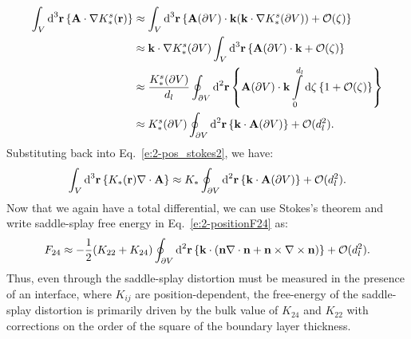 \begin{align}
  \int_{V} \textup{d}^3\mathbf{r} \left \{ \mathbf{A} \cdot \nabla K_{*}^s (\mathbf{r}) \right \} & \approx
  \int_{V} \textup{d}^3\mathbf{r} \left \{\mathbf{A}(\partial V) \cdot \mathbf{k}(\mathbf{k} \cdot \nabla K_*^s(\partial V))  + \mathcal{O}(\zeta) \right \} \\ & \approx
  \mathbf{k} \cdot \nabla K_*^s(\partial V) \int_{V} \textup{d}^3\mathbf{r}\left \{\mathbf{A}(\partial V) \cdot \mathbf{k} + \mathcal{O}(\zeta) \right \} \\ & \approx
  \frac{K_*^s(\partial V)}{d_l} \oint_{\partial V} \textup{d}^2\mathbf{r}\left \{\mathbf{A}(\partial V) \cdot \mathbf{k} \int\limits_{0}^{d_l} \textup{d}\zeta \left \{ 1 + \mathcal{O}(\zeta) \right \}\right \} \\ & \approx
  K_*^s(\partial V) \oint_{\partial V} \textup{d}^2\mathbf{r}\left \{ \mathbf{k}  \cdot \mathbf{A}(\partial V) \right \} + \mathcal{O}(d_l^2).
\end{align}
Substituting back into Eq.~\ref{e:2-pos_stokes2}, we have:
\begin{equation}
  \int_{V}\textup{d}^3\mathbf{r} \left \{ K_{*} (\mathbf{r}) \nabla \cdot \mathbf{A} \right \} \approx
  K_* \oint_{\partial V} \textup{d}^2\mathbf{r} \left \{ \mathbf{k} \cdot \mathbf{A}(\partial V)\right \} + \mathcal{O}(d_l^2).\label{e:2-positionF24}
\end{equation}
Now that we again have a total differential, we can use Stokes's theorem and write saddle-splay free energy in Eq.~\ref{e:2-positionF24} as:
\begin{equation}
  F_{24} \approx -\frac{1}{2}(K_{22} + K_{24})
  \oint_{\partial V}\textup{d}^2 \mathbf{r} \left \{\mathbf{k} \cdot (\mathbf{n} \nabla \cdot \mathbf{n} + \mathbf{n} \times \nabla \times \mathbf{n}) \right \} + \mathcal{O}(d_l^2). \label{e:2-positionF24_surf}
\end{equation}
Thus, even through the saddle-splay distortion must be measured in the presence of an interface, where $K_{ij}$ are position-dependent, the free-energy of the saddle-splay distortion is primarily driven by the bulk value of $K_{24}$ and $K_{22}$ with corrections on the order of the square of the boundary layer thickness.\\

